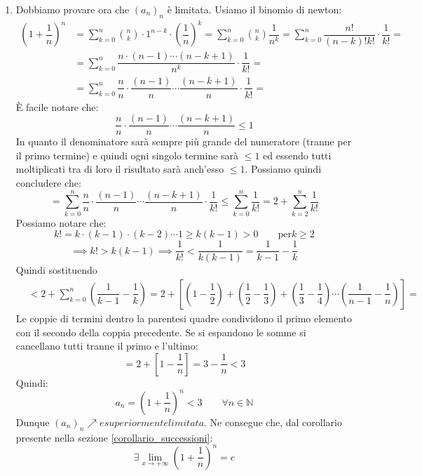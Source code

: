 {\begin{enumerate}
    \item Dobbiamo provare ora che $(a_n)_n$ è limitata. Usiamo il binomio di newton:
    \begin{align*}
        (1+\dfrac{1}{n})^n &= \sum_{k = 0}^{n} \binom{n}{k} \cdot 1^{n-k} \cdot \left(\dfrac{1}{n}\right)^k = \sum_{k = 0}^{n} \binom{n}{k}\dfrac{1}{n^k} = \sum_{k = 0}^{n} \dfrac{n!}{(n-k)!k!}\cdot\dfrac{1}{k!}=\\
        &= \sum_{k = 0}^{n} \dfrac{n \cdot (n-1) \cdots (n-k+1)}{n^k} \cdot \dfrac{1}{k!} =\\
        &= \sum_{k = 0}^{n} \dfrac{n}{n} \cdot \dfrac{(n-1)}{n} \cdots \dfrac{(n-k+1)}{n} \cdot \dfrac{1}{k!} =
    \end{align*}
        È facile notare che:
    \begin{equation*}
        \dfrac{n}{n} \cdot \dfrac{(n-1)}{n} \cdots \dfrac{(n-k+1)}{n} \leq 1
    \end{equation*}
    In quanto il denominatore sarà sempre più grande del numeratore (tranne per il primo termine) e quindi ogni singolo termine sarà $\leq 1$ ed essendo tutti moltiplicati tra di loro il risultato sarà anch'esso $\leq 1$. Possiamo quindi concludere che:
    \begin{equation*}
        = \sum_{k = 0}^{n} \dfrac{n}{n} \cdot \dfrac{(n-1)}{n} \cdots \dfrac{(n-k+1)}{n} \cdot \dfrac{1}{k!} \leq \sum_{k = 0}^{n} \dfrac{1}{k!} = 2 + \sum_{k = 2}^{n} \dfrac{1}{k!}
    \end{equation*}
    Possiamo notare che:
    \begin{equation*}
        k! = k\cdot (k-1)\cdot (k-2) \cdots 1 \geq k (k-1) > 0 \qquad \text{per} k\geq 2
    \end{equation*}
    \begin{equation*}
        \implies k! > k(k-1) \implies \dfrac{1}{k!} < \dfrac{1}{k(k-1)} = \dfrac{1}{k-1} - \dfrac{1}{k}
    \end{equation*}
    Quindi sostituendo
    \begin{align*}
        &< 2 + \sum_{k = 0}^{n} \left(\dfrac{1}{k-1} - \dfrac{1}{k}\right) = 2 + \left[ \left(1-\dfrac{1}{2}\right) + \left(\dfrac{1}{2}-\dfrac{1}{3}\right) + \left(\dfrac{1}{3}-\dfrac{1}{4}\right) \cdots \left(\dfrac{1}{n-1}-\dfrac{1}{n}\right)\right]=
    \end{align*}
    Le coppie di termini dentro la parentesi quadre condividono il primo elemento con il secondo della coppia precedente. Se si espandono le somme si cancellano tutti tranne il primo e l'ultimo:
    \begin{equation*}
        = 2 + \left[1 - \dfrac{1}{n}\right] = 3 -\dfrac{1}{n} < 3
    \end{equation*}
    Quindi:
    \begin{equation*}
        a_n = \left(1+\dfrac{1}{n}\right)^{n} < 3 \qquad \forall n \in \mathbb{N}
    \end{equation*}
    Dunque $(a_n)_n \nearrow e superiormente limitata$. Ne consegue che, dal corollario presente nella sezione \ref{corollario_successioni}:
    \begin{equation*}
        \exists \lim_{x\to + \infty} \left(1+\dfrac{1}{n}\right)^n = e
    \end{equation*}
\end{enumerate}
}
